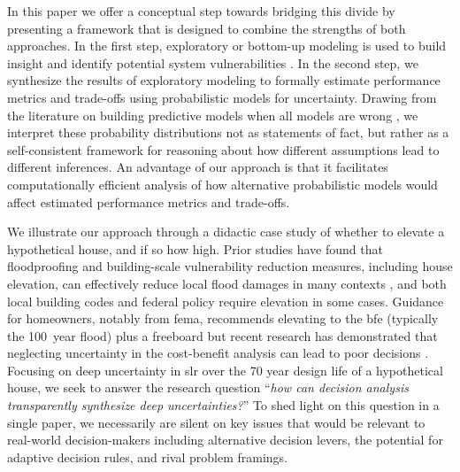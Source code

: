 \documentclass{agujournal2019}
\begin{document}
In this paper we offer a conceptual step towards bridging this divide by presenting a framework that is designed to combine the strengths of both approaches.
In the first step, exploratory or bottom-up modeling is used to build insight and identify potential system vulnerabilities \cite{moallemi_exploratory:2020,bankes:1993,brown_decisionscaling:2012}.
In the second step, we synthesize the results of exploratory modeling to formally estimate performance metrics and trade-offs using probabilistic models for uncertainty.
Drawing from the literature on building predictive models when all models are wrong \cite{box_sciencestatistics:1976,gelman_philosophy:2013,Piironen:2017eh}, we interpret these probability distributions not as statements of fact, but rather as a self-consistent framework for reasoning about how different assumptions lead to different inferences.
An advantage of our approach is that it facilitates computationally efficient analysis of how alternative probabilistic models would affect estimated performance metrics and trade-offs.

We illustrate our approach through a didactic case study of whether to elevate a hypothetical house, and if so how high.
Prior studies have found that floodproofing and building-scale vulnerability reduction measures, including house elevation, can effectively reduce local flood damages in many contexts \cite{demoel_reducing:2014,deruig_building:2020,kreibich_building:2005,slotter_floodproofing:2020,rozer_coping:2016,mobley_mitigation:2020,aerts_cost:2018}, and both local building codes \cite{asce_7-10:2013,bruneau_multihazard:2017,asce_24-05:2006} and federal policy \cite{FEMA_p-55:2011} require elevation in some cases.
Guidance for homeowners, notably from \gls{fema}, recommends elevating to the \gls{bfe} (typically the \SI{100}{year} flood) plus a freeboard \cite{fema_retrofitting:2014,asce_24-14:2015,fema_retrofitting:2014} but recent research has demonstrated that neglecting uncertainty in the cost-benefit analysis can lead to poor decisions \cite{zarekarizi_suboptimal:2020}.
Focusing on deep uncertainty in \gls{slr} over the 70 year design life of a hypothetical house, we seek to answer the research question ``\emph{how can decision analysis transparently synthesize deep uncertainties?}''
To shed light on this question in a single paper, we necessarily are silent on key issues that would be relevant to real-world decision-makers including alternative decision levers, the potential for adaptive decision rules, and rival problem framings.
\end{document}
